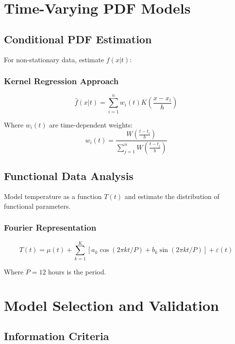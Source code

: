 \documentclass[12pt, xcolor=dvipsnames,svgnames,x11names]{article}
\begin{document}
\section{Time-Varying PDF Models}

\subsection{Conditional PDF Estimation}

For non-stationary data, estimate $f(x|t)$:

\subsubsection{Kernel Regression Approach}
\begin{equation}
\hat{f}(x|t) = \sum_{i=1}^n w_i(t) K\left(\frac{x - x_i}{h}\right)
\end{equation}

Where $w_i(t)$ are time-dependent weights:
\begin{equation}
w_i(t) = \frac{W\left(\frac{t - t_i}{b}\right)}{\sum_{j=1}^n W\left(\frac{t - t_j}{b}\right)}
\end{equation}

\subsection{Functional Data Analysis}

Model temperature as a function $T(t)$ and estimate the distribution of functional parameters.

\subsubsection{Fourier Representation}
\begin{equation}
T(t) = \mu(t) + \sum_{k=1}^K [a_k\cos(2\pi kt/P) + b_k\sin(2\pi kt/P)] + \varepsilon(t)
\end{equation}

Where $P = 12$ hours is the period.

\section{Model Selection and Validation}

\subsection{Information Criteria}
\end{document}
